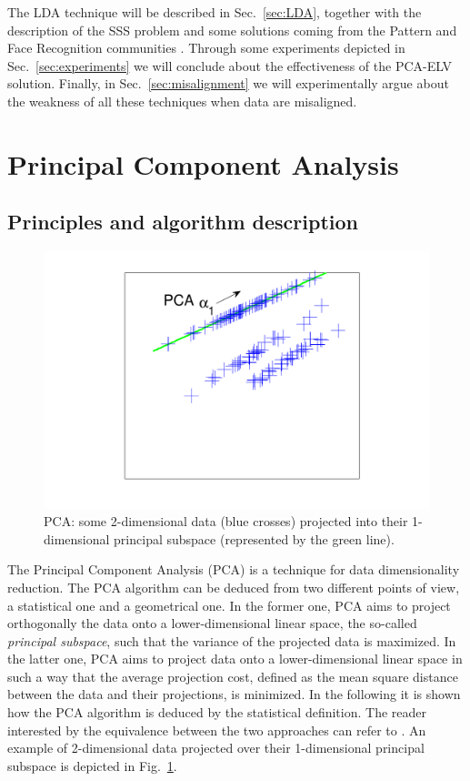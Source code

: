  The LDA technique will be described in Sec.~\ref{sec:LDA}, together with the description of the SSS problem and some solutions coming from the Pattern and Face Recognition communities \cite{eigenfaces,Chen2000,huang,Yu01adirect}. Through some experiments depicted in Sec.~\ref{sec:experiments} we will conclude about the effectiveness of the PCA-ELV solution. Finally, in Sec.~\ref{sec:misalignment} we will experimentally argue about the weakness of all these techniques when data are misaligned.


\section{Principal Component Analysis} \label{sec:PCA}
\subsection{Principles and algorithm description}
\begin{figure}
\centering
\includegraphics[width=.5\textwidth]{../Figures/PCA_LDA_geometric/PCAprojection_unsupervised.pdf} 
\caption{PCA: some 2-dimensional data (blue crosses) projected into their 1-dimensional principal subspace (represented by the green line).}\label{fig:PCAunsupervised}
\end{figure}
The Principal Component Analysis (PCA) is a technique for data dimensionality reduction. The PCA algorithm can be deduced from two different points of view, a statistical one and a geometrical one. In the former one, PCA aims to project orthogonally the data onto a lower-dimensional linear space, the so-called \emph{principal subspace}, such that the variance of the projected data is maximized. In the latter one, PCA aims to project data onto a lower-dimensional linear space in such a way that the average projection cost, defined as the mean square distance between the data and their projections, is minimized. In the following it is shown how the PCA algorithm is deduced by the statistical definition. The reader interested by the equivalence between the two approaches can refer to \cite[Ch.\ 12]{christopher2006pattern}. An example of 2-dimensional data projected over their 1-dimensional principal subspace is depicted in Fig.~\ref{fig:PCAunsupervised}.\\

